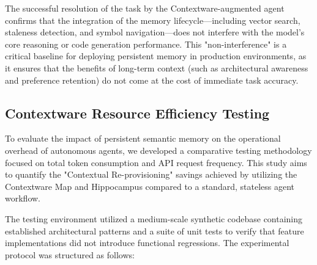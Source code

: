 \documentclass[conference]{IEEEtran}
\begin{document}
The successful resolution of the task by the Contextware-augmented agent confirms that the integration of the memory lifecycle—including vector search, staleness detection, and symbol navigation—does not interfere with the model's core reasoning or code generation performance. This "non-interference" is a critical baseline for deploying persistent memory in production environments, as it ensures that the benefits of long-term context (such as architectural awareness and preference retention) do not come at the cost of immediate task accuracy.

\subsection{Contextware Resource Efficiency Testing}
To evaluate the impact of persistent semantic memory on the operational overhead of autonomous agents, we developed a comparative testing methodology focused on total token consumption and API request frequency. This study aims to quantify the "Contextual Re-provisioning" savings achieved by utilizing the Contextware Map and Hippocampus compared to a standard, stateless agent workflow.

The testing environment utilized a medium-scale synthetic codebase containing established architectural patterns and a suite of unit tests to verify that feature implementations did not introduce functional regressions. The experimental protocol was structured as follows:
\end{document}
